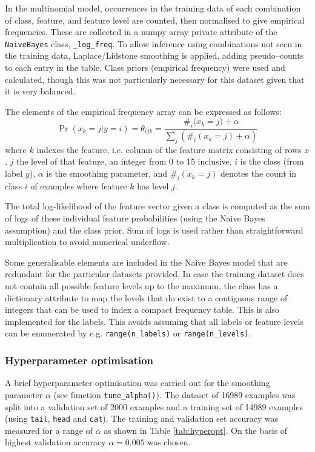 \documentclass[11pt, twocolumn, a4paper]{article}
\begin{document}
In the multinomial model, occurrences in the training data of each combination of class, feature, and feature level are counted, then normalised to give empirical frequencies. These are collected in a numpy array private attribute of the \texttt{NaiveBayes} class, \texttt{\_log\_freq}.
To allow inference using combinations not seen in the training data, Laplace/Lidstone smoothing is applied, adding pseudo--counts to each entry in the table. Class priors (empirical frequency) were used and calculated, though this was not particularly necessary for this dataset given that it is very balanced.

The elements of the empirical frequency array can be expressed as follows:
\begin{displaymath}
\Pr(x_k = j | y=i) =
\theta_{ijk} = \frac{\#_{i}({x_k=j)} + \alpha}{\sum_{j}(\#_{i}(x_k=j) + \alpha)}
\end{displaymath}
where $k$ indexes the feature, i.e. column of the feature matrix consisting of rows $x$, $j$ the level of that feature, an integer from 0 to 15 inclusive, $i$ is the class (from label $y$), $\alpha$ is the smoothing parameter, and $\#_i(x_k=j)$ denotes the count in class $i$ of examples where feature $k$ has level $j$.

The total log-likelihood of the feature vector given a class is computed as the sum of logs of these individual feature probabilities (using the Naive Bayes assumption) and the class prior. Sum of logs is used rather than straightforward multiplication to avoid numerical underflow.

Some generalisable elements are included in the Naive Bayes model that are redundant for the particular datasets provided. In case the training dataset does not contain all possible feature levels up to the maximum, the class has a dictionary attribute to map the levels that do exist to a contiguous range of integers that can be used to index a compact frequency table. This is also implemented for the labels. This avoids assuming that all labels or feature levels can be enumerated by e.g. \texttt{range(n\_labels)} or \texttt{range(n\_levels)}.


\subsubsection{Hyperparameter optimisation}
A brief hyperparameter optimisation was carried out for the smoothing parameter $\alpha$ (see function \texttt{tune\_alpha()}). The dataset of 16989 examples was split into a validation set of 2000 examples and a training set of 14989 examples (using \texttt{tail}, \texttt{head} and \texttt{cat}). The training and validation set accuracy was measured for a range of $\alpha$ as shown in Table \ref{tab:hyperopt}. On the basis of highest validation accuracy $\alpha=0.005$ was chosen.
\end{document}
